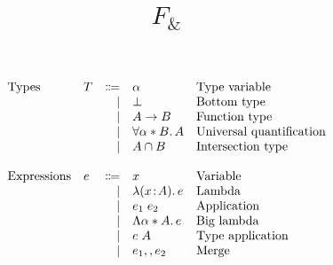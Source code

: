 \documentclass[preprint]{sigplanconf}
\newcommand{\name}{{\bf $F_{\&}$}\xspace}
\begin{document}
\setlength{\pdfpageheight}{\paperheight}
\setlength{\pdfpagewidth}{\paperwidth}

\title{\name}


\begin{figure}
  \[
  \begin{array}{l}
    \begin{array}{llrll}
      \text{Types}
      & T & \Coloneqq & \alpha     & \text{Type variable} \\
      &         & \mid & \bot            & \text{Bottom type} \\
      &        & \mid & A \to B         & \text{Function type}\\
      &         & \mid & \forall \alpha * B.\, A   & \text{Universal quantification} \\
      &         & \mid & A \cap B  & \text{Intersection type} \\

      \\
      \text{Expressions}
      & e & \Coloneqq & x            & \text{Variable} \\
      &   & \mid & \lambda (x \!:\! A).\, e        & \text{Lambda} \\
      &   & \mid & e_1 \; e_2  & \text{Application} \\
      &   & \mid & \Lambda \alpha * A.\, e    & \text{Big lambda} \\
      &   & \mid & e \; A         & \text{Type application} \\
      &   & \mid &  e_1 ,, e_2 & \text{Merge} \\


\end{array}
\end{array}\]
\end{figure}
\end{document}
